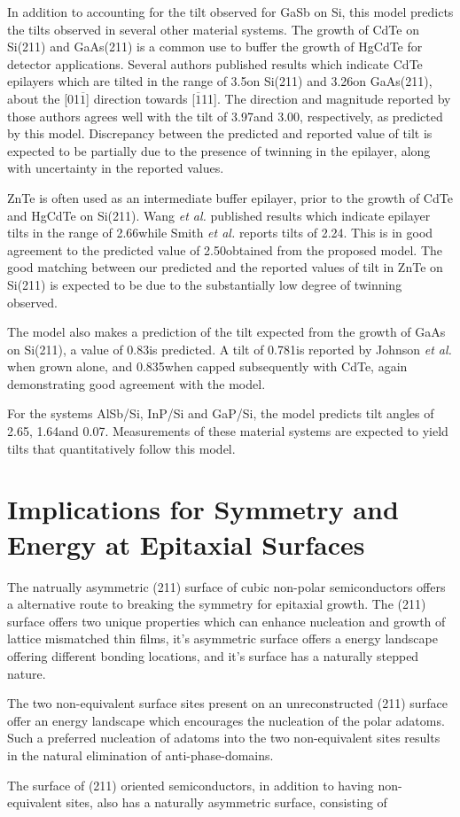 In addition to accounting for the tilt observed for GaSb on Si, this model predicts the tilts observed in several other material systems. The growth of CdTe on Si(211) and GaAs(211) is a common use to buffer the growth of HgCdTe for detector applications. Several authors\cite{Triboulet2009,Yu1999,Lange1991} published results which indicate CdTe epilayers which are tilted in the range of 3.5\degree on Si(211)\cite{Zhao2011} and 3.26\degree on GaAs(211)\cite{Johnson2011}, about the [01$\overline{1}$] direction towards [$\overline{1}$11]. The direction and magnitude reported by those authors agrees well with the tilt of 3.97\degree and 3.00\degree, respectively, as predicted by this model. Discrepancy between the predicted and reported value of tilt is expected to be partially due to the presence of twinning in the epilayer, along with uncertainty in the reported values.

ZnTe is often used as an intermediate buffer epilayer, prior to the growth of CdTe and HgCdTe on Si(211).\cite{Zhao2011,Dhar1997a} Wang \textit{et al.}\cite{Wang2011a} published results which indicate epilayer tilts in the range of 2.66\degree while Smith \textit{et al.}\cite{smith2012_znte} reports tilts of 2.24\degree. This is in good agreement to the predicted value of 2.50\degree obtained from the proposed model. The good matching between our predicted and the reported values of tilt in ZnTe on Si(211) is expected to be due to the substantially low degree of twinning observed.

The model also makes a prediction of the tilt expected from the growth of GaAs on Si(211), a value of 0.83\degree is predicted. A tilt of 0.781\degree is reported by Johnson \textit{et al.}\cite{Johnson2011} when grown alone, and 0.835\degree when capped subsequently with CdTe, again demonstrating good agreement with the model.

For the systems AlSb/Si, InP/Si and GaP/Si, the model predicts tilt angles of 2.65\degree, 1.64\degree and 0.07\degree. Measurements of these material systems are expected to yield tilts that quantitatively follow this model.
\section{Implications for Symmetry and Energy at Epitaxial Surfaces}
The natrually asymmetric (211) surface of cubic non-polar semiconductors offers a alternative route to breaking the symmetry for epitaxial growth. The (211) surface offers two unique properties which can enhance nucleation and growth of lattice mismatched thin films, it's asymmetric surface offers a energy landscape offering different bonding locations, and it's surface has a naturally stepped nature.

The two non-equivalent surface sites present on an unreconstructed (211) surface offer an energy landscape which encourages the nucleation of the polar adatoms. Such a preferred nucleation of adatoms into the two non-equivalent sites results in the natural elimination of anti-phase-domains.

The surface of (211) oriented semiconductors, in addition to having non-equivalent sites, also has a naturally asymmetric surface, consisting of 